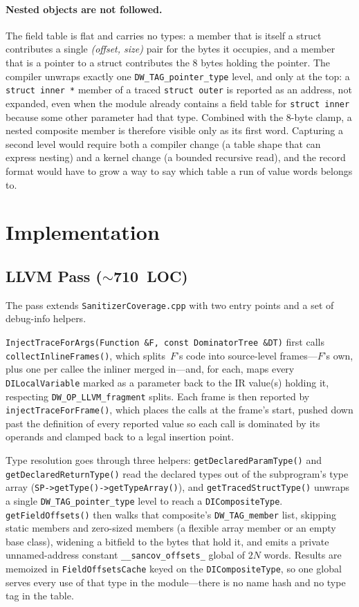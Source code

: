 \documentclass{article}
\begin{document}
\paragraph{Nested objects are not followed.} The field table is flat and
carries no types: a member that is itself a struct contributes a single
\emph{(offset, size)} pair for the bytes it occupies, and a member that is a
pointer to a struct contributes the 8 bytes holding the pointer. The compiler
unwraps exactly one \texttt{DW\_TAG\_pointer\_type} level, and only at the top:
a \texttt{struct inner *} member of a traced \texttt{struct outer} is reported
as an address, not expanded, even when the module already contains a field
table for \texttt{struct inner} because some other parameter had that type.
Combined with the 8-byte clamp, a nested composite member is therefore visible
only as its first word. Capturing a second level would require both a compiler
change (a table shape that can express nesting) and a kernel change (a bounded
recursive read), and the record format would have to grow a way to say which
table a run of value words belongs to.

\section{Implementation}\label{sec:impl}

\subsection{LLVM Pass ($\sim$710~LOC)}

The pass extends \texttt{SanitizerCoverage.cpp} with two entry points and a
set of debug-info helpers.

\texttt{InjectTraceForArgs(Function \&F, const DominatorTree \&DT)} first calls
\texttt{collectInlineFrames()}, which splits~$F$'s code into source-level
frames---$F$'s own, plus one per callee the inliner merged in---and, for each,
maps every \texttt{DILocalVariable} marked as a parameter back to the IR
value(s) holding it, respecting \texttt{DW\_OP\_LLVM\_fragment} splits. Each
frame is then reported by \texttt{injectTraceForFrame()}, which places the
calls at the frame's start, pushed down past the definition of every reported
value so each call is dominated by its operands and clamped back to a legal
insertion point.

Type resolution goes through three helpers:
\texttt{getDeclaredParamType()} and \texttt{getDeclaredReturnType()} read the
declared types out of the subprogram's type array
(\texttt{SP->getType()->getTypeArray()}), and
\texttt{getTracedStructType()} unwraps a single
\texttt{DW\_TAG\_pointer\_type} level to reach a \texttt{DICompositeType}.
\texttt{getFieldOffsets()} then walks that composite's \texttt{DW\_TAG\_member}
list, skipping static members and zero-sized members (a flexible array member
or an empty base class), widening a bitfield to the bytes that hold it, and
emits a private unnamed-address constant \texttt{\_\_sancov\_offsets\_} global
of $2N$ words. Results are memoized in \texttt{FieldOffsetsCache} keyed on the
\texttt{DICompositeType}, so one global serves every use of that type in the
module---there is no name hash and no type tag in the table.
\end{document}

